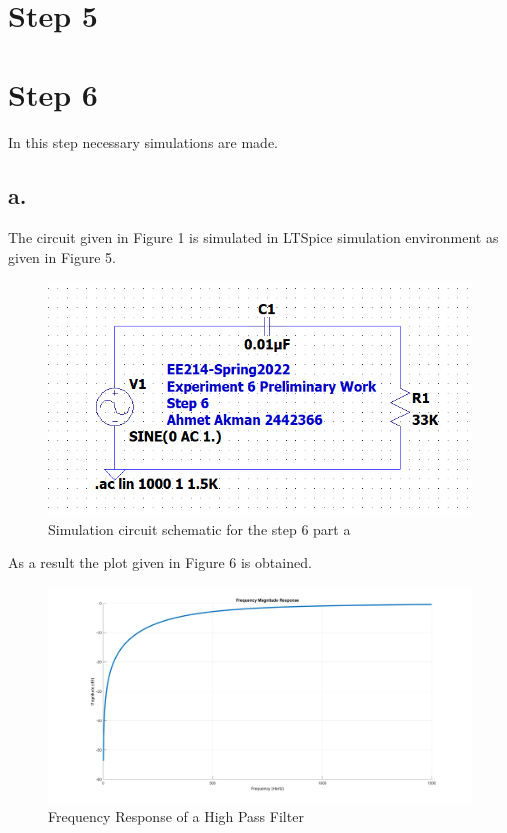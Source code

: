 \documentclass[letterpaper,12pt]{article}
\begin{document}
\section{Step 5}


\section{Step 6}
In this step necessary simulations are made.

\subsection{a.}
The  circuit given in Figure 1 is simulated in LTSpice simulation environment as given in Figure 5.
\begin{figure}[H]
    \centering
    \includegraphics[width=1\textwidth]{6aSim.png}
    \caption{Simulation circuit schematic for the step 6 part a}
\end{figure} 
As a result the plot given in Figure 6 is obtained.
\begin{figure}[H]
    \centering
    \includegraphics[width=1\textwidth]{6_1.png}
    \caption{Frequency Response of a High Pass Filter}
\end{figure} 
\end{document}
